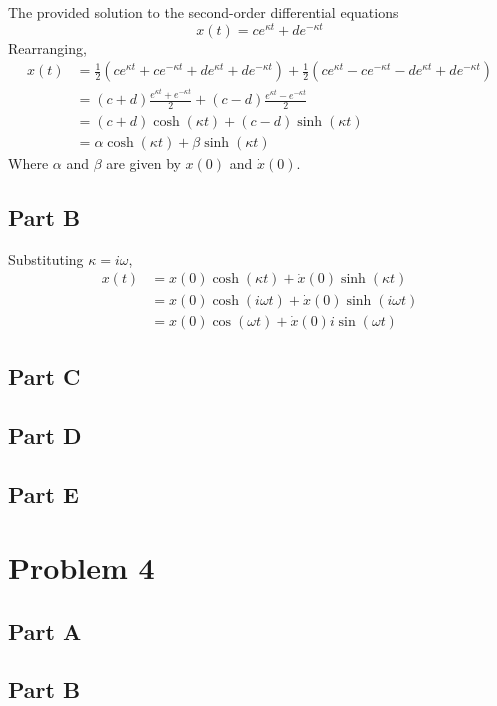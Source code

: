 \documentclass{article}
\begin{document}
The provided solution to the second-order differential equations
$$ x(t) = c e^{\kappa t} + d e^{-\kappa t} $$
Rearranging,
\begin{align*}
  x(t) &= \frac{1}{2} \left(c e^{\kappa t} + c e^{- \kappa t} + d e^{\kappa
  t} + d e^{-\kappa t} \right) + \frac{1}{2} \left(c e^{\kappa t} - c e^{-
  \kappa t} - d e^{\kappa t} + d e^{-\kappa t} \right) \\
  &= (c + d) \frac{e^{\kappa t} + e^{-\kappa t}}{2} + (c - d) \frac{e^{\kappa
  t} - e^{-\kappa t}}{2} \\
  &= (c + d) \cosh(\kappa t) + (c - d) \sinh(\kappa t) \\
  &= \alpha \cosh(\kappa t) + \beta \sinh(\kappa t)
\end{align*}
Where $\alpha$ and $\beta$ are given by $x(0)$ and $\dot{x}(0)$.

\subsection*{Part B}

Substituting $\kappa = i \omega$,
\begin{align*}
  x(t) &= x(0) \cosh(\kappa t) + \dot{x}(0) \sinh(\kappa t) \\
  &= x(0) \cosh(i \omega t) + \dot{x}(0) \sinh(i \omega t) \\
  &= x(0) \cos(\omega t) + \dot{x}(0) i \sin(\omega t)
\end{align*}

\subsection*{Part C}

\subsection*{Part D}

\subsection*{Part E}

\section*{Problem 4}

\subsection*{Part A}

\subsection*{Part B}
\end{document}
